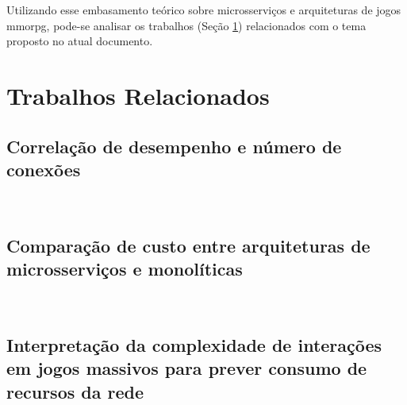 Utilizando esse embasamento teórico sobre microsserviços e arquiteturas de jogos \ac{mmorpg}, pode-se analisar os trabalhos (Seção \ref{sec:similares}) relacionados com o tema proposto no atual documento.

\section{Trabalhos Relacionados}
\label{sec:similares}

\subsection{Correlação de desempenho e número de conexões}
~\cite{1417630}

\subsection{Comparação de custo entre arquiteturas de microsserviços e monolíticas}
~\cite{7515686}

\subsection{Interpretação da complexidade de interações em jogos massivos para prever consumo de recursos da rede}
~\cite{6374456}
